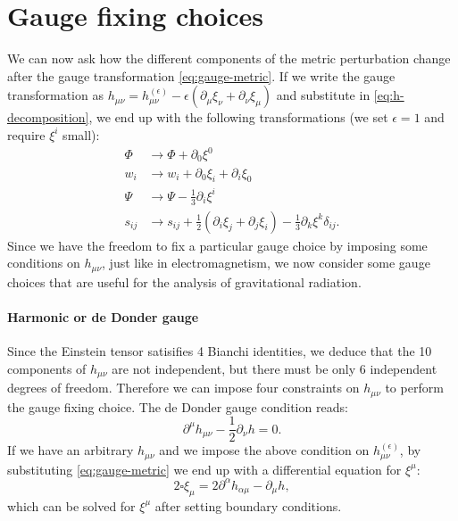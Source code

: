 \documentclass[a4paper]{article}
\begin{document}
\section{Gauge fixing choices}\label{sec:gauge-fixing}
We can now ask how the different components of the metric perturbation change after the gauge transformation \eqref{eq:gauge-metric}. If we write the gauge transformation as $h_{\mu\nu} = h_{\mu\nu}^{(\epsilon)} - \epsilon(\partial_{\mu}\xi_{\nu} + \partial_{\nu}\xi_{\mu})$ and substitute in \eqref{eq:h-decomposition}, we end up with the following transformations (we set $\epsilon = 1$ and require $\xi^i$ small):
\begin{subequations}\label{eq:transformations}
  \begin{align}
    \Phi &\rightarrow \Phi + \partial_0 \xi^0\\
    w_i &\rightarrow w_i + \partial_0 \xi_i + \partial_i \xi_0\\
    \Psi &\rightarrow \Psi - \frac{1}{3}\partial_i \xi^i\\
    s_{ij} &\rightarrow s_{ij} + \frac{1}{2}(\partial_i \xi_j + \partial_j \xi_i) - \frac{1}{3}\partial_k \xi^k\delta_{ij}.
  \end{align}
\end{subequations}
Since we have the freedom to fix a particular gauge choice by imposing some conditions on $h_{\mu\nu}$, just like in electromagnetism, we now consider some gauge choices that are useful for the analysis of gravitational radiation.

\paragraph{Harmonic or de Donder gauge\\}
Since the Einstein tensor satisifies 4 Bianchi identities, we deduce that the 10 components of $h_{\mu\nu}$ are not independent, but there must be only 6 independent degrees of freedom. Therefore we can impose four constraints on $h_{\mu\nu}$ to perform the gauge fixing choice. The de Donder gauge condition reads:
\begin{equation}
  \partial^{\mu}h_{\mu\nu} - \frac{1}{2}\partial_{\nu}h = 0.
  \label{eq:dedonder}
\end{equation}
If we have an arbitrary $h_{\mu\nu}$ and we impose the above condition on $h^{(\epsilon)}_{\mu\nu}$, by substituting \eqref{eq:gauge-metric} we end up with a differential equation for $\xi^{\mu}$:
$$2 \square \xi_{\mu} = 2 \partial^{\alpha}h_{\alpha \mu} - \partial_{\mu}h,$$
which can be solved for $\xi^{\mu}$ after setting boundary conditions.
\end{document}
